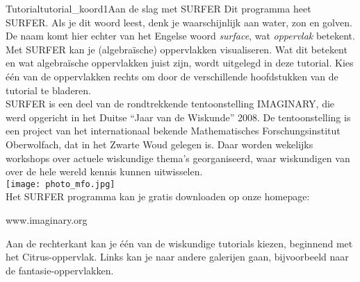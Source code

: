 \begin{surferIntroPage}{Tutorial}{tutorial_koord1}{Aan de slag met SURFER}
Dit programma heet SURFER. Als je dit woord leest, denk je waarschijnlijk aan water, zon en golven. De naam komt hier echter van het Engelse woord {\it surface}, wat {\it oppervlak} betekent.
\\
Met SURFER kan je (algebra\"ische) oppervlakken visualiseren. Wat dit betekent en wat algebra\"ische oppervlakken juist zijn, wordt uitgelegd in deze tutorial. Kies \'e\'en van de oppervlakken rechts om door de verschillende hoofdstukken van de tutorial te bladeren.\\
SURFER is een deel van de rondtrekkende tentoonstelling IMAGINARY, die werd opgericht in het Duitse ``Jaar van de Wiskunde'' 2008. De tentoonstelling is een project van het internationaal bekende Mathematisches Forschungsinstitut Oberwolfach, dat in het Zwarte Woud gelegen is. Daar worden wekelijks workshops over actuele wiskundige thema's georganiseerd, waar wiskundigen van over de hele wereld kennis kunnen uitwisselen. \\
\vspace{0.2cm} \hspace{3.5cm}\texttt{[image: photo\_mfo.jpg]}\\
Het SURFER programma kan je gratis downloaden op onze homepage: \\
\begin{centering}
www.imaginary.org\\
\end{centering}
 \vspace{0.2cm}
Aan de rechterkant kan je \'e\'en van de wiskundige tutorials kiezen, beginnend met het Citrus-oppervlak. Links kan je naar andere galerijen gaan, bijvoorbeeld naar de fantasie-oppervlakken.
\end{surferIntroPage}
